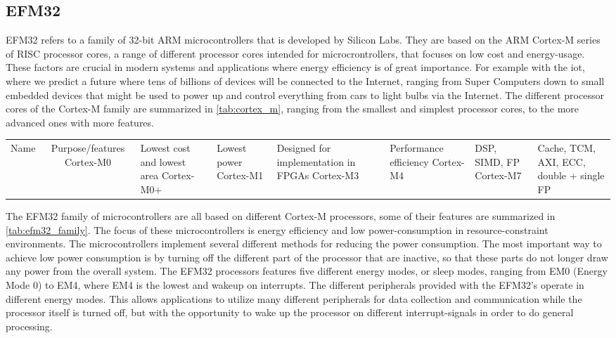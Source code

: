 
\subsection{EFM32}
\label{sub:emf32}

EFM32 refers to a family of 32-bit ARM microcontrollers that is developed by Silicon Labs. They are
based on the ARM Cortex-M series of RISC processor cores, a range of different processor cores
intended for microcrontrollers, that focuses on low cost and energy-usage. These factors are crucial
in modern systems and applications where energy efficiency is of great importance. For example with
the \gls{iot}, where we predict a future where tens of billions of devices will be connected to the
Internet, ranging from Super Computers down to small embedded devices that might be used to power up
and control everything from cars to light bulbs via the Internet. The different processor cores of
the Cortex-M family are summarized in \autoref{tab:cortex_m}, ranging from the smallest and simplest
processor cores, to the more advanced ones with more features.

\begin{centering}
\begin{tabular}{c|c}
Name & Purpose/features
Cortex-M0 & Lowest cost and lowest area
Cortex-M0+ & Lowest power
Cortex-M1 & Designed for implementation in FPGAs
Cortex-M3 & Performance efficiency
Cortex-M4 & DSP, SIMD, FP
Cortex-M7 & Cache, TCM, AXI, ECC, double + single FP
\caption{Cortex-M}
\label{tab:cortex_m}
\end{tabular}
\end{centering}

The EFM32 family of microcontrollers are all based on different Cortex-M processors, some of their
features are summarized in \autoref{tab:efm32_family}. The focus of these microcontrollers is energy
efficiency and low power-consumption in resource-constraint environments. The microcontrollers
implement several different methods for reducing the power consumption. The most important way to
achieve low power consumption is by turning off the different part of the processor that are
inactive, so that these parts do not longer draw any power from the overall system. The EFM32
processors features five different energy modes, or sleep modes, ranging from EM0 (Energy Mode 0) to
EM4, where EM4 is the lowest and wakeup on interrupts. The different peripherals provided with the
EFM32's operate in different energy modes. This allows applications to utilize many different
peripherals for data collection and communication while the processor itself is turned off, but with
the opportunity to wake up the processor on different interrupt-signals in order to do general
processing.

